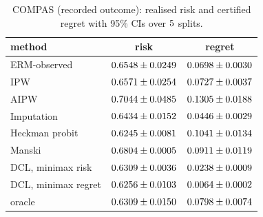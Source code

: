 \begin{table}[h]
\centering\small
\caption{COMPAS (recorded outcome): realised risk and certified regret with
95\% CIs over $5$ splits.}
\label{tab:compas-ci}
\begin{tabular}{lcc}
\toprule
method & risk & regret\\
\midrule
ERM-observed & $0.6548\pm0.0249$ & $0.0698\pm0.0030$\\
IPW & $0.6571\pm0.0254$ & $0.0727\pm0.0037$\\
AIPW & $0.7044\pm0.0485$ & $0.1305\pm0.0188$\\
Imputation & $0.6434\pm0.0152$ & $0.0446\pm0.0029$\\
Heckman probit & $0.6245\pm0.0081$ & $0.1041\pm0.0134$\\
Manski & $0.6804\pm0.0005$ & $0.0911\pm0.0119$\\
DCL, minimax risk & $0.6309\pm0.0036$ & $0.0238\pm0.0009$\\
DCL, minimax regret & $0.6256\pm0.0103$ & $0.0064\pm0.0002$\\
oracle & $0.6309\pm0.0150$ & $0.0798\pm0.0074$\\
\bottomrule
\end{tabular}
\end{table}

